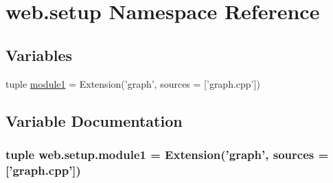 \hypertarget{namespaceweb_1_1setup}{\section{web.\-setup Namespace Reference}
\label{namespaceweb_1_1setup}
}
\subsection*{Variables}
\begin{DoxyCompactItemize}
\item 
tuple \hyperlink{namespaceweb_1_1setup_ad0ce9204ecf224ca2a7c050f612ca10a}{module1} = Extension('graph', sources = \mbox{[}'graph.\-cpp'\mbox{]})
\end{DoxyCompactItemize}


\subsection{Variable Documentation}
\hypertarget{namespaceweb_1_1setup_ad0ce9204ecf224ca2a7c050f612ca10a}{
\subsubsection[{module1}]{\setlength{\rightskip}{0pt plus 5cm}tuple web.\-setup.\-module1 = Extension('graph', sources = \mbox{[}'graph.\-cpp'\mbox{]})}}\label{namespaceweb_1_1setup_ad0ce9204ecf224ca2a7c050f612ca10a}
